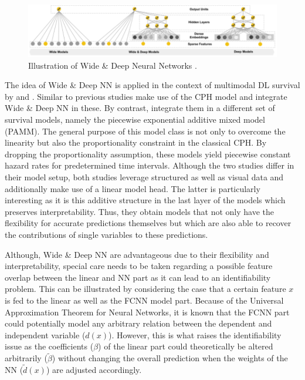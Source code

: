 \documentclass[
]{krantz}
\begin{document}
\begin{figure}

{\centering \includegraphics[width=1\linewidth]{figures/03-02-struc+unstruc-data/WideandDeepNN} 

}

\caption{Illustration of Wide \& Deep Neural Networks \citep{WideDeepNN2016}.}\label{fig:wide-deep-nn}
\end{figure}



The idea of Wide \& Deep NN is applied in the context of multimodal DL survival by \citet{Poelsterl2020} and \citet{DeepPAMM2022}. Similar to previous studies \citet{Poelsterl2020} make use of the CPH model and integrate Wide \& Deep NN in these. By contrast, \citet{DeepPAMM2022} integrate them in a different set of survival models, namely the piecewise exponential additive mixed model (PAMM). The general purpose of this model class is not only to overcome the linearity but also the proportionality constraint in the classical CPH. By dropping the proportionality assumption, these models yield piecewise constant hazard rates for predetermined time intervals. Although the two studies differ in their model setup, both studies leverage structured as well as visual data and additionally make use of a linear model head. The latter is particularly interesting as it is this additive structure in the last layer of the models which preserves interpretability. Thus, they obtain models that not only have the flexibility for accurate predictions themselves but which are also able to recover the contributions of single variables to these predictions.

Although, Wide \& Deep NN are advantageous due to their flexibility and interpretability, special care needs to be taken regarding a possible feature overlap between the linear and NN part as it can lead to an identifiability problem. This can be illustrated by considering the case that a certain feature \(x\) is fed to the linear as well as the FCNN model part. Because of the Universal Approximation Theorem for Neural Networks, it is known that the FCNN part could potentially model any arbitrary relation between the dependent and independent variable (\(d(x)\)). However, this is what raises the identifiability issue as the coefficients (\(\beta\)) of the linear part could theoretically be altered arbitrarily (\(\widetilde{\beta}\)) without changing the overall prediction when the weights of the NN (\(\widetilde{d}(x)\)) are adjusted accordingly.
\end{document}
